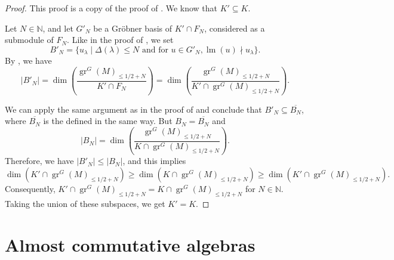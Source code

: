 \documentclass[a4paper, 12pt, reqno]{amsart}
\theoremstyle{remark}
\numberwithin{equation}{subsection}
\DeclareMathOperator{\gr}{gr}
\DeclareMathOperator{\lm}{lm}
\begin{document}
\begin{proof}
  This proof is a copy of the proof of .
  We know that $K' \subseteq K$.

  Let $N \in \mathbb{N}$, and let $G'_N$ be a Gr\"{o}bner basis of $K' \cap F_N$, considered as a submodule of $F_N$.
  Like in the proof of , we set
  \begin{equation*}
    B'_N = \{u_{\lambda} \mid \Delta(\lambda) \le N\text{ and for }u \in G'_N, \lm(u) \nmid u_{\lambda}\}.
  \end{equation*}
  By \cite[Proposition 3.6.4]{adams_introduction_1994}, we have
  \begin{equation*}
    |B'_N| = \dim\left(\frac{\gr^G(M)_{\le 1/2 + N}}{K' \cap F_N}\right) = \dim\left(\frac{\gr^G(M)_{\le 1/2 + N}}{K' \cap \gr^G(M)_{\le 1/2 + N}}\right).
  \end{equation*}

  We can apply the same argument as in the proof of  and conclude that $B'_N \subseteq \overline{B_N}$, where $\overline{B_N}$ is the defined in the same way.
  But $B_N = \overline{B_N}$ and
  \begin{equation*}
    |B_N| = \dim\left(\frac{\gr^G(M)_{\le 1/2 + N}}{K \cap \gr^G(M)_{\le 1/2 + N}}\right).
  \end{equation*}
  Therefore, we have $|B'_N| \le |B_N|$, and this implies
  \begin{equation*}
    \dim(K' \cap \gr^G(M)_{\le 1/2 + N}) \ge \dim(K \cap \gr^G(M)_{\le 1/2 + N}) \ge \dim(K' \cap \gr^G(M)_{\le 1/2 + N}).
  \end{equation*}
  Consequently, $K' \cap \gr^G(M)_{\le 1/2 + N} = K \cap \gr^G(M)_{\le 1/2 + N}$ for $N \in \mathbb{N}$.
  Taking the union of these subspaces, we get $K' = K$.
\end{proof}

\appendix
\section{Almost commutative algebras}
\label{sec:almost-comm-algebr}
\end{document}
